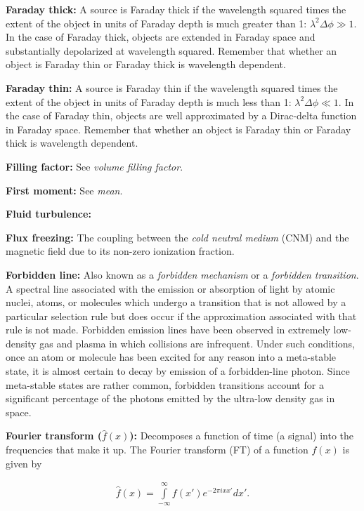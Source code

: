 \documentclass[a4paper,10pt]{article}
\begin{document}
{\noindent}\textbf{Faraday thick:} A source is Faraday thick if the wavelength squared times the extent of the object in units of Faraday depth is much greater than 1: $\lambda^2\Delta\phi\gg1$. In the case of Faraday thick, objects are extended in Faraday space and substantially depolarized at wavelength squared. Remember that whether an object is Faraday thin or Faraday thick is wavelength dependent.

{\noindent}\textbf{Faraday thin:} A source is Faraday thin if the wavelength squared times the extent of the object in units of Faraday depth is much less than 1: $\lambda^2\Delta\phi\ll1$. In the case of Faraday thin, objects are well approximated by a Dirac-delta function in Faraday space. Remember that whether an object is Faraday thin or Faraday thick is wavelength dependent.

{\noindent}\textbf{Filling factor:} See \textit{volume filling factor}.

{\noindent}\textbf{First moment:} See \textit{mean}.

{\noindent}\textbf{Fluid turbulence:}

{\noindent}\textbf{Flux freezing:} The coupling between the \textit{cold neutral medium} (CNM) and the magnetic field due to its non-zero ionization fraction.

{\noindent}\textbf{Forbidden line:} Also known as a \textit{forbidden mechanism} or a \textit{forbidden transition}. A spectral line associated with the emission or absorption of light by atomic nuclei, atoms, or molecules which undergo a transition that is not allowed by a particular selection rule but does occur if the approximation associated with that rule is not made. Forbidden emission lines have been observed in extremely low-density gas and plasma in which collisions are infrequent. Under such conditions, once an atom or molecule has been excited for any reason into a meta-stable state, it is almost certain to decay by emission of a forbidden-line photon. Since meta-stable states are rather common, forbidden transitions account for a significant percentage of the photons emitted by the ultra-low density gas in space.

{\noindent}\textbf{Fourier transform ($\hat{f}(x)$):} Decomposes a function of time (a signal) into the frequencies that make it up. The Fourier transform (FT) of a function $f(x)$ is given by

\begin{align*}
    \hat{f}(x) = \int\limits_{-\infty}^\infty f(x')e^{-2\pi ixx'}dx'.
\end{align*}
\end{document}
